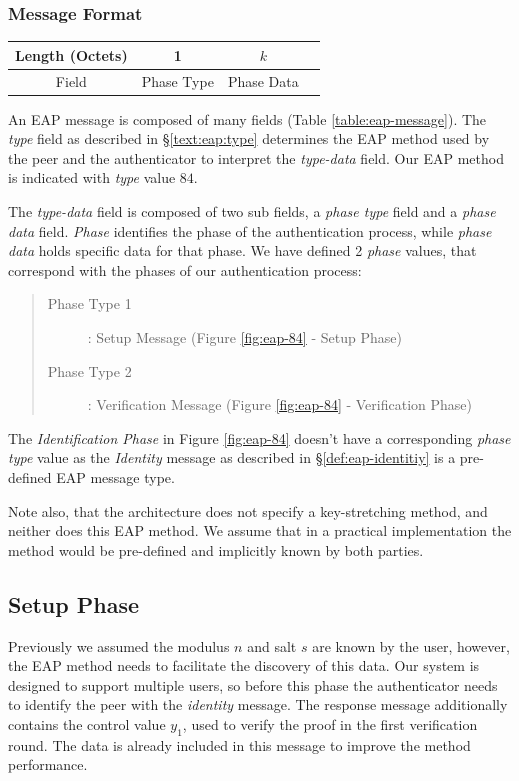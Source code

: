 \subsubsection{Message Format}

\begin{center}
\begin{tabular}{|c|c|c|c|}
	\hline
	Length (Octets) & 1 & $k$\\
	\hline
	Field & Phase Type & Phase Data\\
	\hline
\end{tabular}
\end{center}

\noindent
An EAP message is composed of many fields (Table \ref{table:eap-message}).
The \textit{type} field as described in \S\ref{text:eap:type} determines the EAP method used by the peer and the authenticator to interpret the \textit{type-data} field.
Our EAP method is indicated with \textit{type} value $84$.

The \textit{type-data} field is composed of two sub fields, a \textit{phase type} field and a \textit{phase data} field.
\textit{Phase} identifies the phase of the authentication process, while \textit{phase data} holds specific data for that phase.
We have defined 2 \textit{phase} values, that correspond with the phases of our authentication process:

\begin{quote}
	\begin{description}
		\item [Phase Type 1]: Setup Message (Figure \ref{fig:eap-84} - Setup Phase)
		\item [Phase Type 2]: Verification Message (Figure \ref{fig:eap-84} - Verification Phase)
	\end{description}
\end{quote}

The \textit{Identification Phase} in Figure \ref{fig:eap-84} doesn't have a corresponding \textit{phase type} value as the \textit{Identity} message as described in \S\ref{def:eap-identitiy} is a pre-defined EAP message type.

Note also, that the architecture does not specify a key-stretching method, and neither does this EAP method.
We assume that in a practical implementation the method would be pre-defined and implicitly known by both parties.

\subsection{Setup Phase}
Previously we assumed the modulus $n$ and salt $s$ are known by the user, however, the EAP method needs to facilitate the discovery of this data.
Our system is designed to support multiple users, so before this phase the authenticator needs to identify the peer with the \textit{identity} message.
The response message additionally contains the control value $y_1$, used to verify the proof in the first verification round. The data is already included in this message to improve the method performance.

